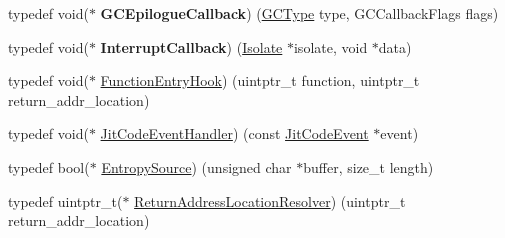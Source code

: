 \begin{DoxyCompactItemize}
\item 
\hypertarget{namespacev8_a4a818ae1aee0cb378a4c2037dfc4a4c2}{}typedef void($\ast$ {\bfseries G\+C\+Epilogue\+Callback}) (\hyperlink{namespacev8_ac109d6f27e0c0f9ef4e98bcf7a806cf2}{G\+C\+Type} type, G\+C\+Callback\+Flags flags)\label{namespacev8_a4a818ae1aee0cb378a4c2037dfc4a4c2}

\item 
\hypertarget{namespacev8_af07fcf2ef61237b7ba67242700b6a875}{}typedef void($\ast$ {\bfseries Interrupt\+Callback}) (\hyperlink{classv8_1_1_isolate}{Isolate} $\ast$isolate, void $\ast$data)\label{namespacev8_af07fcf2ef61237b7ba67242700b6a875}

\item 
typedef void($\ast$ \hyperlink{namespacev8_aaf07fb6bb13f295da3c6568938b7dec5}{Function\+Entry\+Hook}) (uintptr\+\_\+t function, uintptr\+\_\+t return\+\_\+addr\+\_\+location)
\item 
typedef void($\ast$ \hyperlink{namespacev8_a39243bc91e63d64d111452fdb98c4733}{Jit\+Code\+Event\+Handler}) (const \hyperlink{structv8_1_1_jit_code_event}{Jit\+Code\+Event} $\ast$event)
\item 
typedef bool($\ast$ \hyperlink{namespacev8_ab699f4bbbb56350e6e915682e420fcdc}{Entropy\+Source}) (unsigned char $\ast$buffer, size\+\_\+t length)
\item 
typedef uintptr\+\_\+t($\ast$ \hyperlink{namespacev8_a8ce54c75241be41ff6a25e9944eefd2a}{Return\+Address\+Location\+Resolver}) (uintptr\+\_\+t return\+\_\+addr\+\_\+location)
\end{DoxyCompactItemize}

